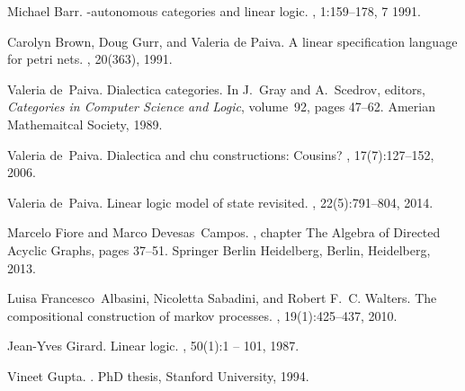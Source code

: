 \documentclass{sigplanconf}
\begin{document}

\begin{thebibliography}{10}
  \softraggedright
  
  Michael Barr.
  \newblock *-autonomous categories and linear logic.
  , 1:159--178, 7
  1991.

  Carolyn Brown, Doug Gurr, and Valeria de Paiva.
  \newblock A linear specification language for petri nets.
  , 20(363), 1991.

  Valeria de~Paiva.
  \newblock Dialectica categories.
  \newblock In J.~Gray and A.~Scedrov, editors, {\em Categories in Computer
    Science and Logic}, volume~92, pages 47--62. Amerian Mathemaitcal Society,
  1989.

  Valeria de~Paiva.
  \newblock Dialectica and chu constructions: Cousins?
  , 17(7):127--152, 2006.

  Valeria de~Paiva.
  \newblock Linear logic model of state revisited.
  , 22(5):791--804, 2014.

  Marcelo Fiore and Marco Devesas~Campos.
  , chapter The Algebra of Directed Acyclic
  Graphs, pages 37--51.
  \newblock Springer Berlin Heidelberg, Berlin, Heidelberg, 2013.

  Luisa Francesco~Albasini, Nicoletta Sabadini, and Robert F.~C. Walters.
  \newblock The compositional construction of markov processes.
  , 19(1):425--437, 2010.

  Jean-Yves Girard.
  \newblock Linear logic.
  , 50(1):1 -- 101, 1987.

  Vineet Gupta.
  .
  \newblock PhD thesis, Stanford University, 1994.


\end{thebibliography}
\end{document}
